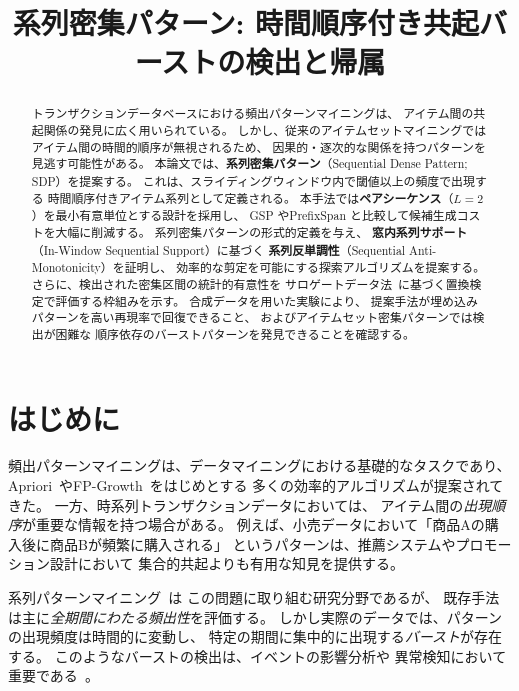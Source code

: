 \documentclass[11pt,a4paper]{article}
\title{\textbf{系列密集パターン: 時間順序付き共起バーストの検出と帰属}}
\author{}
\date{}
\begin{document}
\maketitle

\begin{abstract}
トランザクションデータベースにおける頻出パターンマイニングは、
アイテム間の共起関係の発見に広く用いられている。
しかし、従来のアイテムセットマイニングではアイテム間の時間的順序が無視されるため、
因果的・逐次的な関係を持つパターンを見逃す可能性がある。
本論文では、\textbf{系列密集パターン}（Sequential Dense Pattern; SDP）を提案する。
これは、スライディングウィンドウ内で閾値以上の頻度で出現する
時間順序付きアイテム系列として定義される。
本手法では\textbf{ペアシーケンス}（$L=2$）を最小有意単位とする設計を採用し、
GSP やPrefixSpan と比較して候補生成コストを大幅に削減する。
系列密集パターンの形式的定義を与え、
\textbf{窓内系列サポート}（In-Window Sequential Support）に基づく
\textbf{系列反単調性}（Sequential Anti-Monotonicity）を証明し、
効率的な剪定を可能にする探索アルゴリズムを提案する。
さらに、検出された密集区間の統計的有意性を
サロゲートデータ法~\cite{Lancaster2018}に基づく置換検定で評価する枠組みを示す。
合成データを用いた実験により、
提案手法が埋め込みパターンを高い再現率で回復できること、
およびアイテムセット密集パターンでは検出が困難な
順序依存のバーストパターンを発見できることを確認する。
\end{abstract}

\section{はじめに}
\label{sec:intro}

頻出パターンマイニングは、データマイニングにおける基礎的なタスクであり、
Apriori~\cite{Agrawal1994}やFP-Growth~\cite{Han2000}をはじめとする
多くの効率的アルゴリズムが提案されてきた。
一方、時系列トランザクションデータにおいては、
アイテム間の\emph{出現順序}が重要な情報を持つ場合がある。
例えば、小売データにおいて「商品Aの購入後に商品Bが頻繁に購入される」
というパターンは、推薦システムやプロモーション設計において
集合的共起よりも有用な知見を提供する。

系列パターンマイニング~\cite{Agrawal1995,Pei2001,Zaki2001}は
この問題に取り組む研究分野であるが、
既存手法は主に\emph{全期間にわたる頻出性}を評価する。
しかし実際のデータでは、パターンの出現頻度は時間的に変動し、
特定の期間に集中的に出現する\emph{バースト}が存在する。
このようなバーストの検出は、イベントの影響分析や
異常検知において重要である~\cite{Kleinberg2003}。
\end{document}
